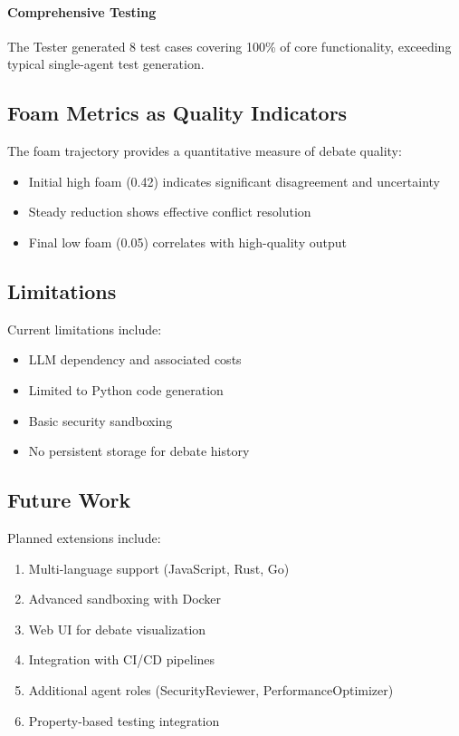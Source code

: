 \documentclass[12pt,a4paper]{article}
\begin{document}
\paragraph{Comprehensive Testing}
The Tester generated 8 test cases covering 100\% of core functionality, exceeding typical single-agent test generation.

\subsection{Foam Metrics as Quality Indicators}

The foam trajectory provides a quantitative measure of debate quality:
\begin{itemize}
    \item Initial high foam (0.42) indicates significant disagreement and uncertainty
    \item Steady reduction shows effective conflict resolution
    \item Final low foam (0.05) correlates with high-quality output
\end{itemize}

\subsection{Limitations}

Current limitations include:
\begin{itemize}
    \item LLM dependency and associated costs
    \item Limited to Python code generation
    \item Basic security sandboxing
    \item No persistent storage for debate history
\end{itemize}

\subsection{Future Work}

Planned extensions include:
\begin{enumerate}
    \item Multi-language support (JavaScript, Rust, Go)
    \item Advanced sandboxing with Docker
    \item Web UI for debate visualization
    \item Integration with CI/CD pipelines
    \item Additional agent roles (SecurityReviewer, PerformanceOptimizer)
    \item Property-based testing integration
\end{enumerate}
\end{document}
